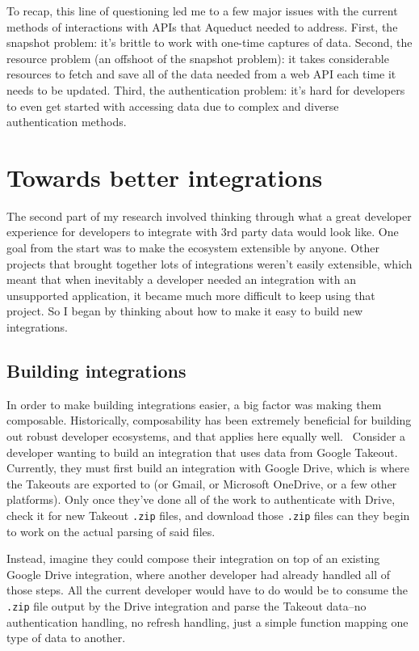 \documentclass[manuscript,review,anonymous]{acmart}
\begin{document}
To recap, this line of questioning led me to a few major issues with the current methods of interactions with APIs that Aqueduct needed to address. First, the snapshot problem: it's brittle to work with one-time captures of data. Second, the resource problem (an offshoot of the snapshot problem): it takes considerable resources to fetch and save all of the data needed from a web API each time it needs to be updated. Third, the authentication problem: it's hard for developers to even get started with accessing data due to complex and diverse authentication methods.

\section{Towards better integrations}
The second part of my research involved thinking through what a great developer experience for developers to integrate with 3rd party data would look like. One goal from the start was to make the ecosystem extensible by anyone. Other projects that brought together lots of integrations weren't easily extensible, which meant that when inevitably a developer needed an integration with an unsupported application, it became much more difficult to keep using that project. So I began by thinking about how to make it easy to build new integrations.

\subsection{Building integrations}
In order to make building integrations easier, a big factor was making them composable. Historically, composability has been extremely beneficial for building out robust developer ecosystems, and that applies here equally well.~\cite{piszekComposabilityOnlyGame2021} Consider a developer wanting to build an integration that uses data from Google Takeout. Currently, they must first build an integration with Google Drive, which is where the Takeouts are exported to (or Gmail, or Microsoft OneDrive, or a few other platforms). Only once they've done all of the work to authenticate with Drive, check it for new Takeout \texttt{.zip} files, and download those \texttt{.zip} files can they begin to work on the actual parsing of said files. 

Instead, imagine they could compose their integration on top of an existing Google Drive integration, where another developer had already handled all of those steps. All the current developer would have to do would be to consume the \texttt{.zip} file output by the Drive integration and parse the Takeout data--no authentication handling, no refresh handling, just a simple function mapping one type of data to another. 
\end{document}
